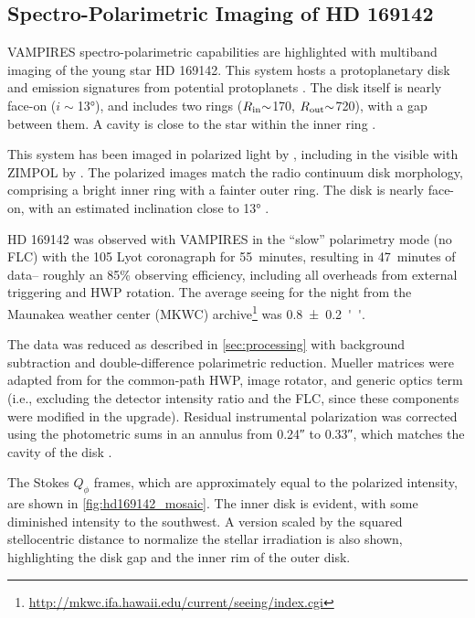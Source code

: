 \subsection{Spectro-Polarimetric Imaging of HD 169142\label{sec:hd169142}}

VAMPIRES spectro-polarimetric capabilities are highlighted with multiband imaging of the young star HD 169142. This system hosts a protoplanetary disk \citep{quanz_gaps_2013} and emission signatures from potential protoplanets \citep{hammond_confirmation_2023}. The disk itself is nearly face-on ($i{\sim}$\ang{13}), and includes two rings ($R_{\rm in}{\sim}$\SI{170}{\mas}, $R_{\rm out}{\sim}$\SI{720}{\mas}), with a gap between them. A cavity is close to the star within the inner ring \citep{fedele_alma_2017}.

This system has been imaged in polarized light by \citet{kuhn_imaging_2001,quanz_gaps_2013,monnier_polarized_2017,pohl_circumstellar_2017}, including in the visible with ZIMPOL by \citet{bertrang_hd_2018}. The polarized images match the radio continuum disk morphology, comprising a bright inner ring with a fainter outer ring. The disk is nearly face-on, with an estimated inclination close to \ang{13} \citep{fedele_alma_2017}.

HD 169142 was observed with VAMPIRES in the ``slow'' polarimetry mode (no FLC) with the \SI{105}{\mas} Lyot coronagraph for \SI{55}{minutes}, resulting in \SI{47}{minutes} of data-- roughly an 85\% observing efficiency, including all overheads from external triggering and HWP rotation. The average seeing for the night from the Maunakea weather center (MKWC) archive\footnote{\url{http://mkwc.ifa.hawaii.edu/current/seeing/index.cgi}} was \SI{0.8\pm0.2}{''}.

The data was reduced as described in \autoref{sec:processing} with background subtraction and double-difference polarimetric reduction. Mueller matrices were adapted from \citet{zhang_characterizing_2023} for the common-path HWP, image rotator, and generic optics term (i.e., excluding the detector intensity ratio and the FLC, since these components were modified in the upgrade). Residual instrumental polarization was corrected using the photometric sums in an annulus from \ang{;;0.24} to \ang{;;0.33}, which matches the cavity of the disk \citep{bertrang_hd_2018}.

The Stokes $Q_\phi$ frames, which are approximately equal to the polarized intensity, are shown in \autoref{fig:hd169142_mosaic}. The inner disk is evident, with some diminished intensity to the southwest. A version scaled by the squared stellocentric distance to normalize the stellar irradiation is also shown, highlighting the disk gap and the inner rim of the outer disk.

